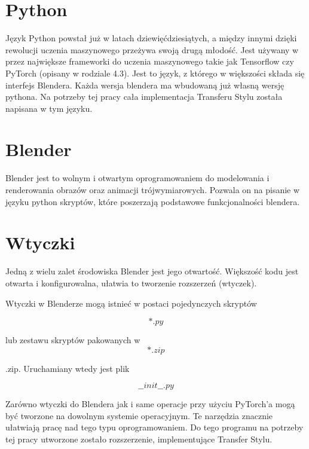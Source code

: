 \documentclass[brudnopis]{xmgr}
\begin{document}
\section{Python\label{s:dsssl}}

Język Python powstał już w latach dziewięćdziesiątych, a między innymi dzięki rewolucji uczenia maszynowego przeżywa swoją drugą młodość. Jest używany w przez największe frameworki do uczenia maszynowego takie jak Tensorflow czy PyTorch (opisany w rodziale  4.3).
Jest to język, z którego w większości składa się interfejs Blendera. Każda wersja blendera ma wbudowaną już własną wersję pythona. Na potrzeby tej pracy cała implementacja Transferu Stylu została napisana w tym języku.

\section{Blender\label{s:dsssl}}

Blender jest to wolnym i otwartym oprogramowaniem do modelowania i renderowania obrazów oraz animacji trójwymiarowych. Pozwala on na pisanie w języku python skryptów, które poszerzają podstawowe funkcjonalności blendera.

\section{Wtyczki\label{s:dsssl}}

Jedną z wielu zalet środowiska Blender jest jego otwartość. Większość kodu jest otwarta i konfigurowalna, ułatwia to tworzenie rozszerzeń (wtyczek).

Wtyczki w Blenderze mogą istnieć w postaci pojedynczych skryptów 

\begin{equation}
*.py
\end{equation}

lub zestawu skryptów pakowanych w 
\begin{equation}
*.zip
\end{equation}

.zip. Uruchamiany wtedy jest plik 

\begin{equation}
\_\_init\_\_.py
\end{equation}


Zarówno wtyczki do Blendera jak i same operacje przy użyciu PyTorch’a mogą być tworzone na dowolnym systemie operacyjnym. Te narzędzia znacznie ułatwiają pracę nad tego typu oprogramowaniem.
 Do tego programu na potrzeby tej pracy utworzone zostało rozszerzenie, implementujące Transfer Stylu. 
\end{document}
